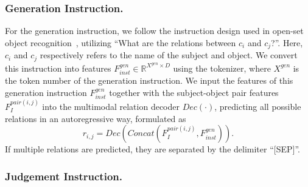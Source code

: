 \subsubsection{Generation Instruction.}
\label{openpsg:sec:generation_inst}
For the generation instruction, we follow the instruction design used in open-set object recognition~\citep{yu2023towards}, utilizing ``What are the relations between $c_i$ and $c_j$?''.
Here, $c_i$ and $c_j$ respectively refers to the name of the subject and object.
We convert this instruction into features $F_{inst}^{gen} \in \mathbb{R}^{X^{gen} \times D}$ using the tokenizer, where $X^{gen}$ is the token number of the generation instruction.
We input the features of this generation instruction $F_{inst}^{gen}$ together with the subject-object pair features $F_{I}^{pair(i,j)}$ into the multimodal relation decoder $Dec(\cdot)$, predicting all possible relations in an autoregressive way, formulated as 
\begin{equation}
    r_{i,j} = Dec(Concat(F_{I}^{pair(i,j)}, F_{inst}^{gen})).
\end{equation}
If multiple relations are predicted, they are separated by the delimiter ``[SEP]''.

\subsubsection{Judgement Instruction.}
\label{openpsg:sec:judgement_inst}

